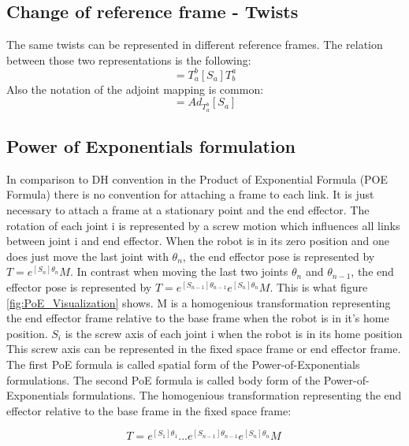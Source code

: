 \documentclass{tpk4170report}
\begin{document}
\subsection{Change of reference frame - Twists}
The same twists can be represented in different reference frames. The relation between those two representations is the following: 
\begin{equation}
   [S_{b}]= T_{a}^{b}[S_{a}]T_{b}^{a}
  \label{eqn:Twist_relation}
\end{equation}
Also the notation of the adjoint mapping is common: 
\begin{equation}
  [S_{b}]= Ad_{T_{a}^{b}}[S_{a}]
 \label{eqn:Twist_relation_2}
\end{equation}

\subsection{Power of Exponentials formulation}
In comparison to DH convention in the Product of Exponential Formula (POE Formula) there is no convention for attaching a frame to each link. It is just necessary to attach a frame at a stationary point and the end effector. The rotation of each joint i is represented by a screw motion which influences all links between joint i and end effector. When the robot is in its zero position and one does just move the last joint with \(\theta_{n}\), the end effector pose is represented by \(T = e^{[S_{n}]\theta_{n}} M\). In contrast when moving the last two joints \(\theta_{n}\) and \(\theta_{n-1}\), the end effector pose is represented by \(T = e^{[S_{n-1}]\theta_{n-1}} e^{[S_{n}]\theta_{n}} M\). This is what figure \ref{fig:PoE_Visualization} shows. M is a homogenious transformation representing the end effector frame relative to the base frame when the robot is in it's home position. \(S_{i}\) is the screw axis of each joint i when the robot is in its home position This screw axis can be represented in the fixed space frame or end effector frame. The first PoE formula is called spatial form of the Power-of-Exponentials formulations. The second PoE formula is called body form of the Power-of-Exponentials formulations. The homogenious transformation representing the end effector relative to the base frame in the fixed space frame: 

\begin{equation}
  T = e^{[S_{1}]\theta_{1}} ... e^{[S_{n-1}]\theta_{n-1}} e^{[S_{n}]\theta_{n}} M\
  \label{eqn:spatial_PoE_formula}
\end{equation}
\end{document}
